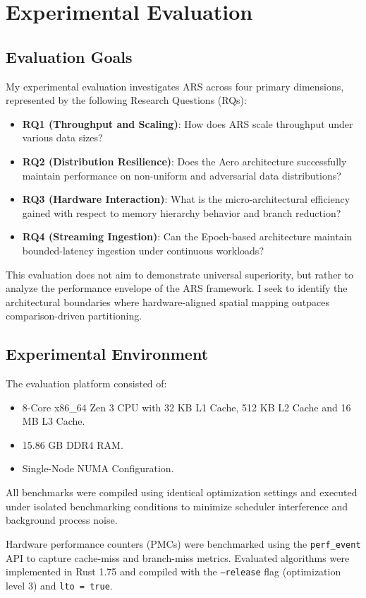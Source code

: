\section{Experimental Evaluation}

\subsection{Evaluation Goals}
My experimental evaluation investigates ARS across four primary dimensions, represented by the following Research Questions (RQs):
\begin{itemize}
 \item \textbf{RQ1 (Throughput and Scaling)}: How does ARS scale throughput under various data sizes?
 \item \textbf{RQ2 (Distribution Resilience)}: Does the Aero architecture successfully maintain performance on non-uniform and adversarial data distributions?
 \item \textbf{RQ3 (Hardware Interaction)}: What is the micro-architectural efficiency gained with respect to memory hierarchy behavior and branch reduction?
 \item \textbf{RQ4 (Streaming Ingestion)}: Can the Epoch-based architecture maintain bounded-latency ingestion under continuous workloads?
\end{itemize}
This evaluation does not aim to demonstrate universal superiority, but rather to analyze the performance envelope of the ARS framework.
I seek to identify the architectural boundaries where hardware-aligned spatial mapping outpaces comparison-driven partitioning.

\subsection{Experimental Environment}
The evaluation platform consisted of:
\begin{itemize}
\item 8-Core x86\_64 Zen 3 CPU with 32 KB L1 Cache, 512 KB L2 Cache and 16 MB L3 Cache.
\item 15.86 GB DDR4 RAM.
\item Single-Node NUMA Configuration.
\end{itemize}
All benchmarks were compiled using identical optimization settings and executed under isolated benchmarking conditions to minimize scheduler interference and background process noise.

Hardware performance counters (PMCs) were benchmarked using the \texttt{perf\_event} API to capture cache-miss and branch-miss metrics.
Evaluated algorithms were implemented in Rust 1.75 and compiled with the \texttt{--release} flag (optimization level 3) and \texttt{lto = true}.

